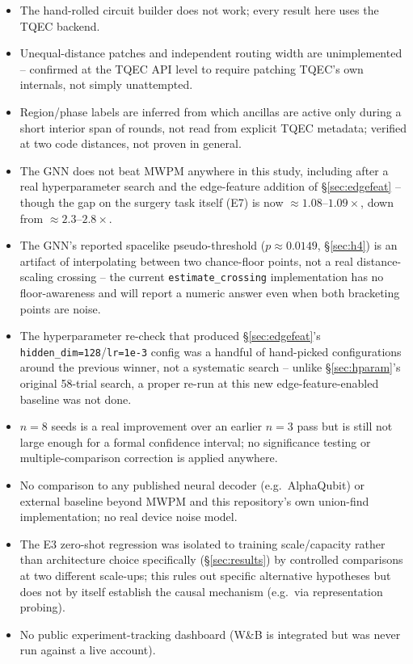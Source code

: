 \documentclass[11pt]{article}
\begin{document}
\begin{itemize}
\item The hand-rolled circuit builder does not work; every result here uses
  the TQEC backend.
\item Unequal-distance patches and independent routing width are
  unimplemented -- confirmed at the TQEC API level to require patching
  TQEC's own internals, not simply unattempted.
\item Region/phase labels are inferred from which ancillas are active only
  during a short interior span of rounds, not read from explicit TQEC
  metadata; verified at two code distances, not proven in general.
\item The GNN does not beat MWPM anywhere in this study, including after a
  real hyperparameter search and the edge-feature addition of
  \S\ref{sec:edgefeat} -- though the gap on the surgery task itself (E7) is
  now $\approx 1.08$--$1.09\times$, down from $\approx 2.3$--$2.8\times$.
\item The GNN's reported spacelike pseudo-threshold ($p\approx0.0149$,
  \S\ref{sec:h4}) is an artifact of interpolating between two chance-floor
  points, not a real distance-scaling crossing -- the current
  \texttt{estimate\_crossing} implementation has no floor-awareness and
  will report a numeric answer even when both bracketing points are noise.
\item The hyperparameter re-check that produced \S\ref{sec:edgefeat}'s
  \texttt{hidden\_dim=128}/\texttt{lr=1e-3} config was a handful of
  hand-picked configurations around the previous winner, not a systematic
  search -- unlike \S\ref{sec:hparam}'s original 58-trial search, a proper
  re-run at this new edge-feature-enabled baseline was not done.
\item $n=8$ seeds is a real improvement over an earlier $n=3$ pass but is
  still not large enough for a formal confidence interval; no significance
  testing or multiple-comparison correction is applied anywhere.
\item No comparison to any published neural decoder (e.g.\ AlphaQubit) or
  external baseline beyond MWPM and this repository's own union-find
  implementation; no real device noise model.
\item The E3 zero-shot regression was isolated to training scale/capacity
  rather than architecture choice specifically (\S\ref{sec:results}) by
  controlled comparisons at two different scale-ups; this rules out
  specific alternative hypotheses but does not by itself establish the
  causal mechanism (e.g.\ via representation probing).
\item No public experiment-tracking dashboard (W\&B is integrated but was
  never run against a live account).
\end{itemize}
\end{document}
